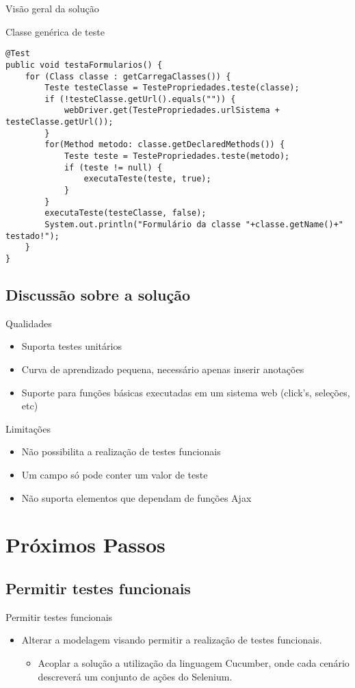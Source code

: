 \documentclass{beamer}
\begin{document}
\begin{frame}[fragile]{Visão geral da solução}
    \item Classe genérica de teste
    \begin{lstlisting}
@Test
public void testaFormularios() {
	for (Class classe : getCarregaClasses()) {
		Teste testeClasse = TestePropriedades.teste(classe);
        if (!testeClasse.getUrl().equals("")) {
            webDriver.get(TestePropriedades.urlSistema + testeClasse.getUrl());
        }
        for(Method metodo: classe.getDeclaredMethods()) {
            Teste teste = TestePropriedades.teste(metodo);
            if (teste != null) {
                executaTeste(teste, true);
            }
        }
        executaTeste(testeClasse, false);
        System.out.println("Formulário da classe "+classe.getName()+" testado!");
	}
}
	\end{lstlisting}
\end{frame}
\subsection{Discussão sobre a solução}
\item Qualidades
    \begin{itemize}
		\item Suporta testes unitários
		\item Curva de aprendizado pequena, necessário apenas inserir anotações
		\item Suporte para funções básicas executadas em um sistema web (click's, seleções, etc)
	\end{itemize}
\item Limitações
    \begin{itemize}
		\item Não possibilita a realização de testes funcionais
		\item Um campo só pode conter um valor de teste
		\item Não suporta elementos que dependam de funções Ajax
	\end{itemize}
\section{Próximos Passos}
\subsection{Permitir testes funcionais}
\begin{frame}{Permitir testes funcionais}
	\begin{itemize}
		\item Alterar a modelagem visando permitir a realização de testes funcionais.
		\begin{itemize}
			\item Acoplar a solução a utilização da linguagem Cucumber, onde cada cenário descreverá um conjunto de ações do Selenium.
		\end{itemize}
	\end{itemize}
\end{frame}
\end{document}
